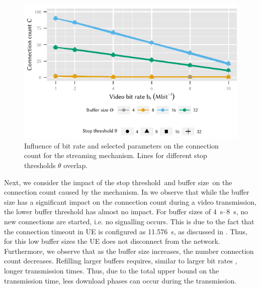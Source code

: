 \begin{figure}
  \centering
  \includegraphics{application/lte_video/numerical_evaluation/figures/bitrate2connections_parameters}
  \caption{Influence of bit rate \bitrate and selected parameters on the connection count \connectioncount for the streaming mechanism. Lines for different stop thresholds \(\theta\) overlap.}
  \label{fig:application:lte_video:numerical_evaluation:energy_consumption:bitrate2connections_parameters}
\end{figure}

Next, we consider the impact of the stop threshold~\bufferlower and buffer size~\buffersize on the connection count \connectioncount caused by the \streaming mechanism.
In  we observe that while the buffer size has a significant impact on the connection count \connectioncount during a video transmission, the lower buffer threshold has almost no impact.
For buffer sizes of \SIrange{4}{8}{\second}, no new connections are started, i.e. no signalling occurs.
This is due to the fact that the connection timeout in \gls{UE} is configured as \SI{11.576}{\second}, as discussed in .
Thus, for this low buffer sizes the \gls{UE} does not disconnect from the network.
Furthermore, we observe that as the buffer size increases, the number connection count \connectioncount decreases.
Refilling larger buffers requires, similar to larger bit rates \bitrate, longer transmission times.
Thus, due to the total upper bound on the transmission time, less download phases can occur during the transmission.
